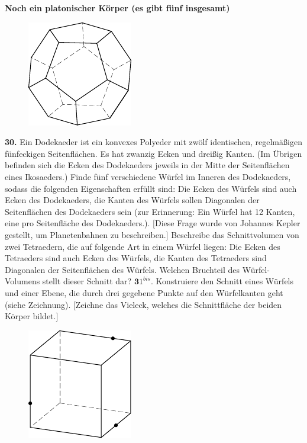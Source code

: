 \documentclass[12pt]{article} %
\begin{document}
\noindent
{\bf Noch ein platonischer Körper (es gibt fünf insgesamt)}
\begin{figure}[h]
\centering
\includegraphics{taskbook-14}\\[2pt]
\end{figure}

\noindent
{\bf 30.} Ein Dodekaeder ist ein konvexes Polyeder mit zwölf identischen, regelmäßigen fünfeckigen Seitenflächen. Es hat zwanzig Ecken und dreißig Kanten. (Im Übrigen befinden sich die Ecken des Dodekaeders jeweils in der Mitte der Seitenflächen eines Ikosaeders.)
Finde fünf verschiedene Würfel im Inneren des Dodekaeders, sodass die folgenden Eigenschaften erfüllt sind: Die Ecken des Würfels sind auch Ecken des Dodekaeders, die Kanten des Würfels sollen Diagonalen der Seitenflächen des Dodekaeders sein (zur Erinnerung: Ein Würfel hat 12 Kanten, eine pro Seitenfläche des Dodekaeders.). 
[Diese Frage wurde von Johannes Kepler gestellt, um Planetenbahnen zu beschreiben.]
\bigskip
\newline\newline\quad
{} Beschreibe das Schnittvolumen von zwei Tetraedern, die auf folgende Art in einem Würfel liegen: Die Ecken des Tetraeders sind auch Ecken des Würfels, die Kanten des Tetraeders sind Diagonalen der Seitenflächen des Würfels.
Welchen Bruchteil des Würfel-Volumens stellt dieser Schnitt dar?
\newline\newline\quad
$\mathbf 31^{bis}.$ 
Konstruiere den Schnitt eines Würfels und einer Ebene, die durch drei gegebene Punkte auf den Würfelkanten geht (siehe Zeichnung). [Zeichne das Vieleck, welches die Schnittfläche der beiden Körper bildet.]
\begin{figure}[h]
\centering
\includegraphics{taskbook-15}
\end{figure}
\end{document}
